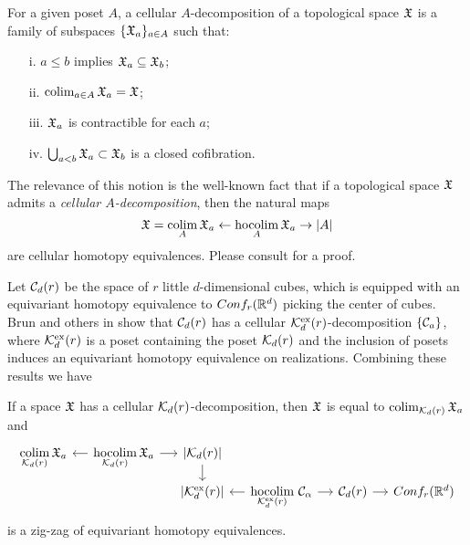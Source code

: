 \begin{definition}\label{cellulardecomposition}
	For a given poset $A$, a cellular $A$-decomposition of a topological space $\mathfrak{X}$ is a family of subspaces $\{\mathfrak{X}_a\}_{a \in A}$ such that:
	\begin{itemize}
		\item [i.] $a \leq b$ implies $\mathfrak{X}_a \subseteq \mathfrak{X}_b$;
		\item [ii.]$\operatorname*{colim}_{a \in A} \mathfrak{X}_a = \mathfrak{X}$;
		\item [iii.]$\mathfrak{X}_a$ is contractible for each $a$;
		\item[iv.] $\bigcup_{a<b} \mathfrak{X}_a \subset \mathfrak{X}_b$ is a closed cofibration.
	\end{itemize}
\end{definition}

The relevance of this notion is the well-known fact that if a topological space $\mathfrak{X}$ admits a \textit{cellular $A$-decomposition}, then the natural maps
\begin{equation}\label{e:cellular poset decomposition}
	\mathfrak{X} = \operatorname*{colim}_A \mathfrak{X}_a \leftarrow \operatorname*{hocolim}_A \mathfrak{X}_a \to \lvert A\rvert
\end{equation}
are cellular homotopy equivalences.
Please consult \cite[\S1.7]{berger1997confspacemodel} for a proof.

Let $\mathcal{C}_d(r)$ be the space of $r$ little $d$-dimensional cubes, which is equipped with an equivariant homotopy equivalence to $Conf_{r}(\mathbb{R}^{d})$ picking the center of cubes.
Brun and others in \cite{brunfiedorowiczvogt2007} show that $\mathcal{C}_d(r)$ has a cellular $\mathcal{K}^{\mathrm{ex}}_d(r)$-decomposition $\{\mathcal{C}_a\}$, where $\mathcal{K}^{\mathrm{ex}}_d(r)$ is a poset containing the poset $\mathcal{K}_d(r)$ and the inclusion of posets induces an equivariant homotopy equivalence on realizations.
Combining these results we have

\begin{proposition}\label{p:zig-zag conf}
	If a space $\mathfrak{X}$ has a cellular $\mathcal{K}_d(r)$-decomposition, then $\mathfrak{X}$ is equal to $\operatorname*{colim}_{\mathcal{K}_d(r)} \mathfrak{X}_a$ and
	\begin{equation*}
		\begin{tikzcd}[column sep=small, row sep=5]
			\displaystyle \colim_{\CG_d(r)} \fX_a & \arrow[l] \displaystyle \hocolim_{\CG_d(r)} \fX_a \arrow[r] & \bars{\CG_d(r)} \arrow[d] & & \\ & &
			\bars{\CG^\ex_d(r)} & \arrow[l] \displaystyle \hocolim_{\CG^\ex_d(r)}\,\cC_\alpha \arrow[r] & \cC_d(r) \arrow[r] & \conf{r}{d}
		\end{tikzcd}
	\end{equation*}
	is a zig-zag of equivariant homotopy equivalences.
\end{proposition}


